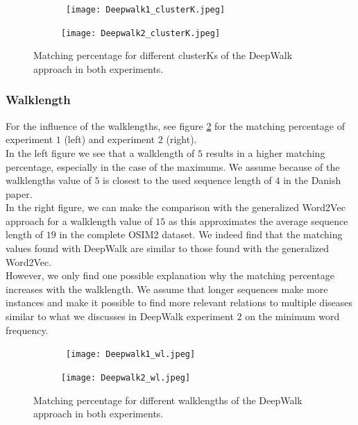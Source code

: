 \begin{figure}[!htb]
	\centering
	\begin{subfigure}[b]{.49\textwidth}\
		\texttt{[image: Deepwalk1\_clusterK.jpeg]}
	\end{subfigure}
	\begin{subfigure}[b]{.49\textwidth}
		\texttt{[image: Deepwalk2\_clusterK.jpeg]}
	\end{subfigure}
	\caption{Matching percentage for different clusterKs of the DeepWalk 	approach in both experiments.}
	\label{fig:dw_clusterK}
\end{figure}


\subsubsection{Walklength}

For the influence of the walklengths, see figure \ref{fig:dw_wl} for the matching percentage of experiment $1$ (left) and experiment $2$ (right). \\

In the left figure we see that a walklength of $5$ results in a higher matching percentage, especially in the case of the maximums. We assume because of the walklengths value of $5$ is closest to the used sequence length of $4$ in the Danish paper. \\

In the right figure, we can make the comparison with the generalized Word2Vec approach for a walklength value of $15$ as this approximates the average sequence length of $19$ in the complete OSIM2 dataset. We indeed find that the matching values found with DeepWalk are similar to those found with the generalized Word2Vec. \\
However, we only find one possible explanation why the matching percentage increases with the walklength. We assume that longer sequences make more instances and make it possible to find more relevant relations to multiple diseases similar to what we discusses in DeepWalk experiment $2$ on the minimum word frequency. \\

\begin{figure}[!htb]
	\centering
	\begin{subfigure}[b]{.49\textwidth}\
		\texttt{[image: Deepwalk1\_wl.jpeg]}
	\end{subfigure}
	\begin{subfigure}[b]{.49\textwidth}
		\texttt{[image: Deepwalk2\_wl.jpeg]}
	\end{subfigure}
	\caption{Matching percentage for different walklengths of the DeepWalk approach in both experiments.}
	\label{fig:dw_wl}
\end{figure}

